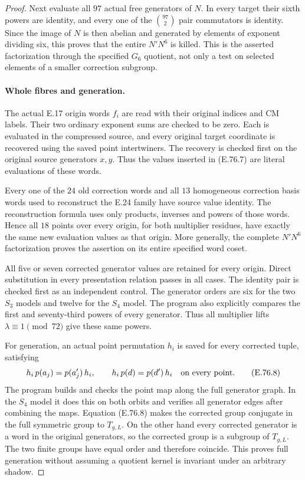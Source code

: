 \begin{proof}
Next evaluate all $97$ actual free generators of $N$.
In every target their sixth powers are identity, and every
one of the $\binom{97}{2}$ pair commutators is identity.
Since the image of $N$ is then abelian and generated by
elements of exponent dividing six, this proves that the
entire $N'N^6$ is killed.  This is the asserted factorization
through the specified $G_6$ quotient, not only a test on
selected elements of a smaller correction subgroup.

\paragraph{Whole fibres and generation.}
The actual E.17 origin words $f_i$ are read with their
original indices and CM labels.  Their two ordinary
exponent sums are checked to be zero.  Each is evaluated
in the compressed source, and every original target
coordinate is recovered using the saved point intertwiners.
The recovery is checked first on the original source
generators $x,y$.  Thus the values inserted in (E.76.7)
are literal evaluations of these words.

Every one of the $24$ old correction words and all $13$
homogeneous correction basis words used to reconstruct
the E.24 family have source value identity.  The reconstruction
formula uses only products, inverses and powers of those
words.  Hence all $18$ points over every origin, for both
multiplier residues, have exactly the same new evaluation
values as that origin.  More generally, the complete
$N'N^6$ factorization proves the assertion on its entire
specified word coset.

All five or seven corrected generator values are retained
for every origin.  Direct substitution in every presentation
relation passes in all cases.  The identity pair is checked
first as an independent control.  The generator orders are
six for the two $S_3$ models and twelve for the $S_4$ model.
The program also explicitly compares the first and
seventy-third powers of every generator.  Thus all multiplier
lifts $\lambda\equiv1\pmod {72}$ give these same powers.

For generation, an actual point permutation $h_i$ is saved
for every corrected tuple, satisfying
\[
       h_i\,p(a_j)=p(a'_j)\,h_i,
       \qquad h_i\,p(d)=p(d')\,h_i
                 \quad\hbox{on every point}.
 \tag{E.76.8}
\]
The program builds and checks the point map along the full
generator graph.  In the $S_4$ model it does this on both
orbits and verifies all generator edges after combining
the maps.  Equation (E.76.8) makes the corrected group
conjugate in the full symmetric group to $T_{g,L}$.
On the other hand every corrected generator is a word in
the original generators, so the corrected group is a
subgroup of $T_{g,L}$.  The two finite groups have equal
order and therefore coincide.  This proves full generation
without assuming a quotient kernel is invariant under
an arbitrary shadow.


\end{proof}
